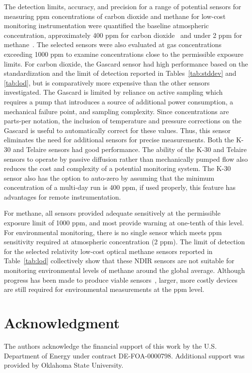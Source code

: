 \documentclass[times]{joehreview}
\begin{document}
	The detection limits, accuracy, and precision for a range of potential sensors for measuring ppm concentrations of carbon dioxide and methane for low-cost monitoring instrumentation were quantified the baseline atmospheric concentration, approximately 400 ppm for carbon dioxide~\cite{blasing_recent_2016,dlugokencky_trends_2016} and under 2 ppm for methane~\cite{turner_large_2016,bamberger_spatial_2014,dlugokencky_trends_2016-1}.  The selected sensors were also evaluated at gas concentrations exceeding 1000 ppm to examine concentrations close to the permissible exposure limits.  For carbon dioxide, the Gascard sensor had high performance based on the standardization and the limit of detection reported in Tables~\ref{tab:stddev} and \ref{tab:lod}, but is comparatively more expensive than the other sensors investigated.  The Gascard is limited by reliance on active sampling which requires a pump that introduces a source of additional power consumption, a mechanical failure point, and sampling complexity.  Since concentrations are parts-per notation, the inclusion of temperature and pressure corrections on the Gascard is useful to automatically correct for these values.  Thus, this sensor eliminates the need for additional sensors for precise measurements.   Both the K-30 and Telaire sensors had good performance.  The ability of the K-30 and Telaire sensors to operate by passive diffusion rather than mechanically pumped flow also reduces the cost and complexity of a potential monitoring system.   The K-30 sensor also has the option to auto-zero by assuming that the minimum concentration of a multi-day run is 400 ppm, if used properly, this feature has advantages for remote instrumentation.
	
	For methane, all sensors provided adequate sensitively at the permissible exposure limit of 1000 ppm, and most provide warning at one-tenth of this level.  For environmental monitoring, there is no single sensor which meets ppm sensitivity required at atmospheric concentration (2 ppm).  The limit of detection for the selected relativity low-cost optical methane sensors reported in Table~\ref{tab:lod} collectively show that these NDIR sensors are not suitable for monitoring environmental levels of methane around the global average.  Although progress has been made to produce viable sensors~\cite{zhu_one_2012}, larger, more costly devices are still required for environmental measurements at the ppm level.
	
	\section*{Acknowledgment}
	The authors acknowledge the financial support of this work by the U.S. Department of Energy under contract DE-FOA-0000798.  Additional support was provided by Oklahoma State University. 
	
	
	
	
\end{document}
